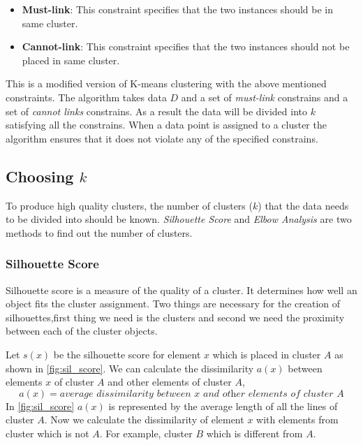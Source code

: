 \begin{itemize}
    \item \textbf{Must-link}: This constraint specifies that the two instances should be in same cluster.
    \item \textbf{Cannot-link}: This constraint specifies that the two instances should not be placed in same cluster.
\end{itemize}

This is a modified version of K-means clustering with the above mentioned constraints. The algorithm takes data $D$ and a set of \textit{must-link} constrains and a set of \textit{cannot links} constrains. As a result the data will be divided into $k$ satisfying all the constrains. When a data point is assigned to a cluster the algorithm ensures that it does not violate any of the specified constrains.



\subsection{Choosing $k$}
To produce high quality clusters, the number of clusters ($k$) that the data needs to be divided into should be known. \textit{Silhouette Score} \cite{rousseeuw1987silhouettes} and \textit{Elbow Analysis} \cite{thorndike1953belongs,ketchen1996application}  are two methods to find out the number of clusters.

\subsubsection{Silhouette Score}
Silhouette score is a measure of the quality of a cluster. It determines how well an object fits the cluster assignment. Two things are necessary for the creation of silhouettes,first thing we need is the clusters and second we need the proximity between each of the cluster objects.

Let $s(x)$ be the silhouette score for element $x$ which is placed in cluster $A$ as shown in \ref{fig:sil_score}. We can calculate the dissimilarity $a(x)$ between elements $x$ of cluster $A$ and other elements of cluster $A$,
\begin{equation}\label{eq:sil_1}
    a(x) = \textit{average dissimilarity between x and other elements of cluster A}
\end{equation}
In \ref{fig:sil_score} $a(x)$ is represented by the average length of all the lines of cluster $A$. Now we calculate the dissimilarity of element $x$ with elements from cluster which is not $A$. For example, cluster $B$ which is different from $A$.

